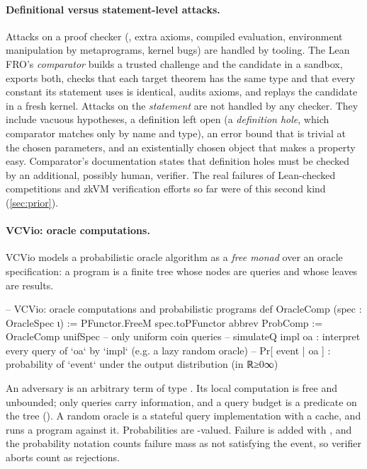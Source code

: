 \paragraph{Definitional versus statement-level attacks.} Attacks on a proof checker
(, extra axioms, compiled evaluation, environment manipulation by metaprograms, kernel
bugs) are handled by tooling. The Lean FRO's \emph{comparator} \cite{comparator} builds a trusted
challenge and the candidate in a sandbox, exports both, checks that each target theorem has the
same type and that every constant its statement uses is identical, audits axioms, and replays the
candidate in a fresh kernel. Attacks on the \emph{statement} are not handled by any checker. They
include vacuous hypotheses, a definition left open (a \emph{definition hole}, which comparator
matches only by name and type), an error bound that is trivial at the chosen parameters, and an
existentially chosen object that makes a property easy. Comparator's documentation states that
definition holes must be checked by an additional, possibly human, verifier. The real failures of
Lean-checked competitions and zkVM verification efforts so far were of this second kind
(\cref{sec:prior}).

\paragraph{VCVio: oracle computations.} VCVio \cite{tuma2024vcvio,tuma2026vcvio} models a
probabilistic oracle algorithm as a \emph{free monad} over an oracle specification: a program is a
finite tree whose nodes are queries and whose leaves are results.

\begin{leancode}
-- VCVio: oracle computations and probabilistic programs
def OracleComp (spec : OracleSpec ι) := PFunctor.FreeM spec.toPFunctor
abbrev ProbComp := OracleComp unifSpec          -- only uniform coin queries
-- simulateQ impl oa : interpret every query of `oa` by `impl` (e.g. a lazy random oracle)
-- Pr[ event | oa ] : probability of `event` under the output distribution (in ℝ≥0∞)
\end{leancode}

\noindent An adversary is an arbitrary term of type . Its local computation
is free and unbounded; only queries carry information, and a query budget is a predicate on the
tree (). A random oracle is a stateful query implementation with a cache, and
 runs a program against it. Probabilities are -valued. Failure is
added with , and the probability notation counts failure mass as not satisfying the
event, so verifier aborts count as rejections.

